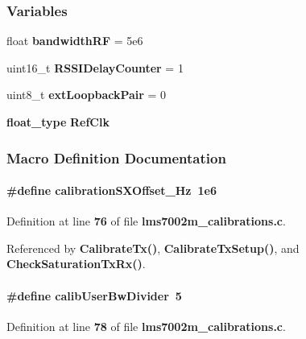 \subsubsection*{Variables}
\begin{DoxyCompactItemize}
\item 
float {\bf bandwidth\+RF} = 5e6
\item 
uint16\+\_\+t {\bf R\+S\+S\+I\+Delay\+Counter} = 1
\item 
uint8\+\_\+t {\bf ext\+Loopback\+Pair} = 0
\item 
{\bf float\+\_\+type} {\bf Ref\+Clk}
\end{DoxyCompactItemize}


\subsubsection{Macro Definition Documentation}
\paragraph[{calibration\+S\+X\+Offset\+\_\+\+Hz}]{\setlength{\rightskip}{0pt plus 5cm}\#define calibration\+S\+X\+Offset\+\_\+\+Hz~1e6}\label{lms7002m__calibrations_8c_a58a4e913f1cec1b7256f672928f32d5e}


Definition at line {\bf 76} of file {\bf lms7002m\+\_\+calibrations.\+c}.



Referenced by {\bf Calibrate\+Tx()}, {\bf Calibrate\+Tx\+Setup()}, and {\bf Check\+Saturation\+Tx\+Rx()}.

\paragraph[{calib\+User\+Bw\+Divider}]{\setlength{\rightskip}{0pt plus 5cm}\#define calib\+User\+Bw\+Divider~5}\label{lms7002m__calibrations_8c_ad22f29824c585276c32a5f2866ccbfe2}


Definition at line {\bf 78} of file {\bf lms7002m\+\_\+calibrations.\+c}.



